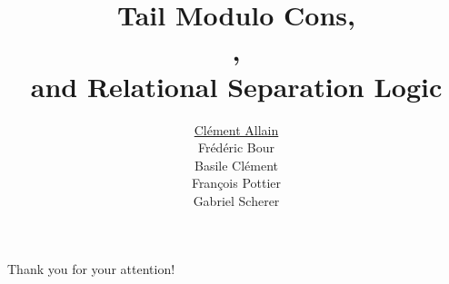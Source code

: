 \documentclass[aspectratio=169]{beamer}
\title{
	Tail Modulo Cons, \\
	\OCaml, \\
	and Relational Separation Logic
}
\author{
	\underline{Clément Allain} \\
	Frédéric Bour \\
	Basile Clément \\
	François Pottier \\
	Gabriel Scherer
}
\begin{document}

\begin{frame}
\titlepage
\end{frame}










\begin{frame}
\LARGE
\begin{center}
	Thank you for your attention!
\end{center}
\end{frame}


\appendix


\end{document}
